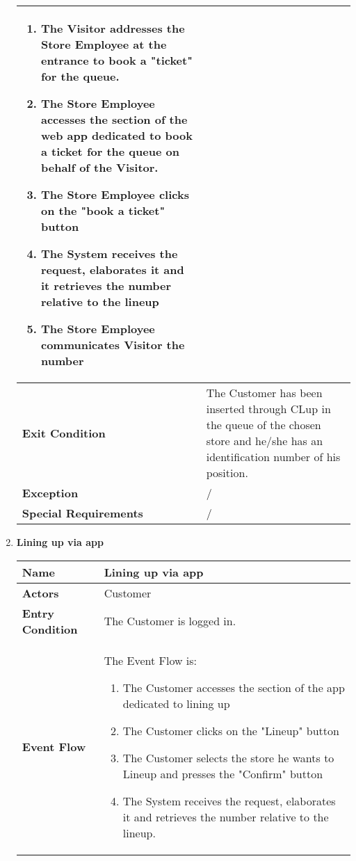 \begin{enumerate}
{\begin{longtable}{|L{4cm}|L{10cm}|}
\begin{enumerate}
                        \item The Visitor addresses the Store Employee at the entrance to book a "ticket" for the queue.
                        \item The Store Employee accesses the section of the web app dedicated to book a ticket for the queue on behalf of the Visitor.
                        \item The Store Employee clicks on the "book a ticket" button
                        \item The System receives the request, elaborates it and it retrieves the number relative to the lineup
                        \item The Store Employee communicates Visitor the number
                    \end{enumerate} \\
                \hline
                \textbf{Exit Condition} & The Customer has been inserted through CLup in the queue of the chosen store and he/she has an identification number of his position. \\
                \hline
                \textbf{Exception} & / \\
                \hline
                \textbf{Special Requirements} & / \\
                \hline
            \end{longtable}}
            \item \textbf{Lining up via app}{\renewcommand{\arraystretch}{2}
            \begin{longtable}{|L{4cm}|L{10cm}|}
                \hline
                \textbf{Name} &  Lining up via app \\
                \hline
                \textbf{Actors} & Customer \\
                \hline
                \textbf{Entry Condition} & The Customer is logged in. \\
                \hline
                \textbf{Event Flow} & The Event Flow is: \begin{enumerate}
                        \item The Customer accesses the section of the app dedicated to lining up
                        \item The Customer clicks on the "Lineup" button
                        \item The Customer selects the store he wants to Lineup and presses the "Confirm" button
                        \item The System receives the request, elaborates it and retrieves the number relative to the lineup.

\end{enumerate}
\end{longtable}}
\end{enumerate}
